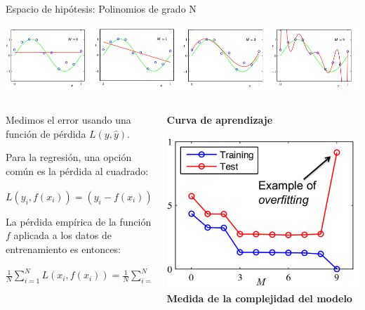 \documentclass[11pt]{beamer}
\begin{document}
\begin{frame}{Espacio de hip\'otesis: Polinomios de grado N}

\includegraphics[scale= 0.33]{TA3.png}

\vspace{0.2cm}

\begin{columns}
\begin{column}{0.55\textwidth}
	
\vspace{0.3cm}


\scriptsize{Medimos el error usando una funci\'on de p\'erdida $L(y, \hat{y})$. 
	
\vspace{0.2cm}

Para la regresi\'on, una opci\'on com\'un es la p\'erdida al cuadrado:
	
\vspace{0.2cm}


$L(y_i, f(x_i)) = (y_i -f(x_i))^2$

\vspace{0.2cm}

La p\'erdida emp\'irica de la funci\'on $f$ aplicada a los datos de entrenamiento es entonces:

\vspace{0.2cm}


$\displaystyle \frac{1}{N}\sum_{i =1}^{N}L(x_i, f(x_i)) = \frac{1}{N}\sum_{i =1}^{N}(y_i -f(x_i))^2$
}
\end{column}
\begin{column}{0.45\textwidth} 
	
\quad \scriptsize\textbf{Curva de aprendizaje}
\vspace{0.2cm}
 
\includegraphics[scale= 0.3]{TA4.png}
\quad \scriptsize\textbf{Medida de la complejidad del modelo}

\end{column}
\end{columns}
\end{frame}
\end{document}
